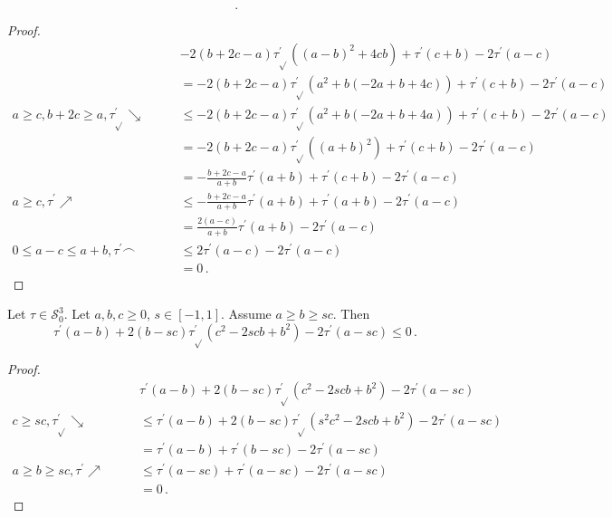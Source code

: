 \documentclass{article}
\newcommand*{\mc}[1]{\mathcal{#1}}
\newcommand{\pr}{^\prime}
\newcommand{\equationFullstop}{\, .}
\newcommand{\eqfs}{\equationFullstop}
\newcommand{\tran}{\tau}
\newcommand{\trans}{\tran_{\!\sqrt{}}}
\newcommand{\dtrans}{\trans\pr}
\newcommand{\dtran}{\tran\pr}
\newcommand{\setccod}[1]{\mc S_0^{#1}}
\newcommand{\incr}{\nearrow}
\newcommand{\decr}{\searrow}
\newcommand{\conc}{\smallfrown}
\begin{document}
\begin{appendix}
\begin{lemma}
\begin{equation}
		\eqfs
	\end{equation}
\end{lemma}
\begin{proof}
	\begin{align*}
		&
		-2(b+2c-a)\dtrans((a-b)^2+4cb) + \dtran(c+b) - 2 \dtran(a - c)
		\\
		\qquad&=  
		-2(b+2c-a)\dtrans(a^2 + b(-2a + b + 4c)) + \dtran(c+b) - 2 \dtran(a - c)
		\\
		a \geq c, b+2c\geq a, \dtrans\decr
		\qquad&\leq
		-2(b+2c-a)\dtrans(a^2 + b(-2a + b + 4a)) + \dtran(c+b) - 2 \dtran(a - c)
		\\
		\qquad&=
		-2(b+2c-a)\dtrans((a+b)^2) + \dtran(c+b) - 2 \dtran(a - c)
		\\
		\qquad&=
		-\frac{b+2c-a}{a+b}\dtran(a+b) + \dtran(c+b) - 2 \dtran(a - c)
		\\
		a \geq c, \dtran\incr
		\qquad&\leq
		-\frac{b+2c-a}{a+b}\dtran(a+b) + \dtran(a+b) - 2 \dtran(a - c)
		\\
		\qquad&=
		\frac{2(a-c)}{a+b}\dtran(a+b) - 2 \dtran(a - c)
		\\
		0 \leq a-c \leq a+b, \dtran\conc
		\qquad&\leq
		2\dtran(a-c) - 2 \dtran(a - c)
		\\
		\qquad&=
		0
		\eqfs
	\end{align*}
\end{proof}
%
%
%
\begin{lemma}\label{mech:3}
	Let $\tran\in\setccod3$.
	Let $a,b,c\geq0$, $s\in[-1,1]$.
	Assume $a \geq b \geq sc$.
	Then
	\begin{equation*}
		\dtran(a-b) + 2(b-sc)\dtrans(c^2-2scb+b^2) - 2 \dtran(a - sc) \leq 0
		\eqfs
	\end{equation*}
\end{lemma}
%
\begin{proof}
	\begin{align*}
		&
		\dtran(a-b) + 2(b-sc)\dtrans(c^2-2scb+b^2) - 2 \dtran(a - sc)
		\\
		c\geq sc, \dtrans\decr
		\qquad&\leq
		\dtran(a-b) + 2(b-sc)\dtrans(s^2c^2-2scb+b^2) - 2 \dtran(a - sc)
		\\
		\qquad&=
		\dtran(a-b) + \dtran(b-sc) - 2 \dtran(a - sc)
		\\
		a \geq b \geq sc, \dtran\incr
		\qquad&\leq
		\dtran(a-sc) + \dtran(a-sc) - 2 \dtran(a - sc)
		\\
		\qquad&=
		0
		\eqfs
	\end{align*}
\end{proof}
%
%
%
%
\begin{lemma}\label{mech:5}

\end{lemma}
\end{appendix}
\end{document}
